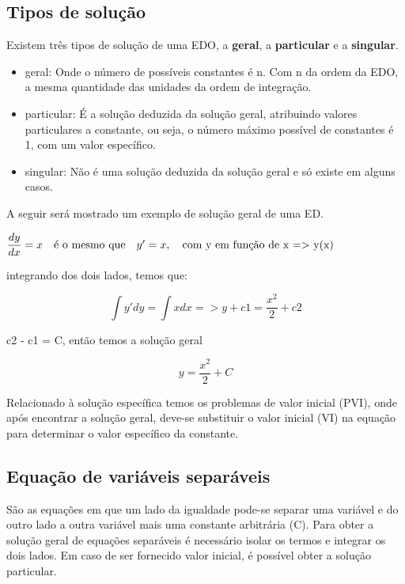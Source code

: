 \subsection[Tipos de solução]{Tipos de solução}
Existem três tipos de solução de uma EDO, a \textbf{geral}, a \textbf{particular} e a \textbf{singular}.
\begin{itemize}
	\item{geral:} Onde o número de possíveis constantes é n. Com n da ordem da EDO, a mesma quantidade das unidades da ordem de integração. 
	\item{particular:} É a solução deduzida da solução geral, atribuindo valores particulares a constante, ou seja, o número máximo possível de constantes é 1, com um valor específico.
	\item{singular:} Não é uma solução deduzida da solução geral e só existe em alguns casos.
\end{itemize}

A seguir será mostrado um exemplo de solução geral de uma ED.  \linebreak

			$ \dfrac{dy}{dx} = x \quad  \textrm{é o mesmo que} \quad y' = x, \quad \textrm{com y em função de x => y(x)} \\
			$
			

			integrando dos dois lados, temos que: \linebreak
			
			\begin{equation}
				\int y' dy = \int x dx => y + c1 = \dfrac{x^2}{2} + c2 
			\end{equation}
			
			\begin{center}
				c2 - c1 = C, então temos a solução geral  \\
			\end{center}
			
			\begin{equation}
				y = \frac{x^2}{2} + C
			\end{equation}
		
	
	

Relacionado à solução específica temos os problemas de valor inicial (PVI), onde após encontrar a solução geral, deve-se substituir o valor inicial (VI) na equação para determinar o valor específico da constante.

		

\subsection[Equação de variáveis separáveis]{Equação de variáveis separáveis}
São as equações em que um lado da igualdade pode-se separar uma variável e do outro lado a outra variável mais uma constante arbitrária (C). 
Para obter a solução geral de equações separáveis é necessário isolar os termos e integrar os dois lados. Em caso de ser fornecido valor inicial, é possível obter a solução particular.

